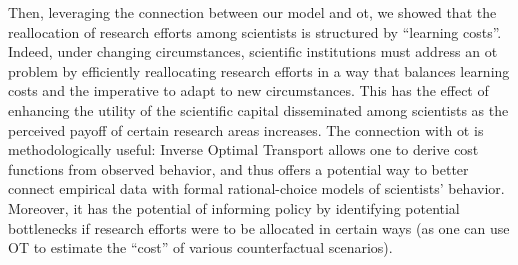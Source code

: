 \documentclass{article}
\begin{document}
Then, leveraging the connection between our model and \gls{ot}, we showed that the reallocation of research efforts among scientists is structured by ``learning costs''. Indeed, under changing circumstances, scientific institutions must address an \gls{ot} problem by efficiently reallocating research efforts in a way that balances learning costs and the imperative to adapt to new circumstances. This has the effect of enhancing the utility of the scientific capital disseminated among scientists as the perceived payoff of certain research areas increases. The connection with \gls{ot} is methodologically useful: Inverse Optimal Transport allows one to derive cost functions from observed behavior, and thus offers a potential way to better connect empirical data with formal rational-choice models of scientists' behavior. Moreover, it has the potential of informing policy by identifying potential bottlenecks if research efforts were to be allocated in certain ways (as one can use OT to estimate the ``cost'' of various counterfactual scenarios). %
\end{document}
